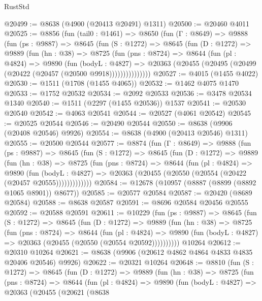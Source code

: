 \begin{lexlean}{RustStd}
\begin{coremodule}
@20499 := @8638 (@4900 (@20413 @20491) @1311)
@20500 := @20460 @4011
@20525 := @8856
    (fun (tail0 : @1461) =>
    @8650
      (fun (Γ : @8649) =>
      @9888
        (fun (ps : @9887) =>
        @8645
          (fun (S : @1272) =>
          @8645
            (fun (D : @1272) =>
            @9889
              (fun (hn : @38) =>
              @8725
                (fun (pns : @8724) =>
                @8644
                  (fun (pl : @4824) =>
                  @9890
                    (fun (bodyL : @4827) =>
                    @20363 (@20455 (@20495 (@20499 (@20422 (@20457 (@20500 @9918)))))))))))))))
@20527 := @4015 (@1455 @4022)
@20530 := @1511 (@1708 (@1455 @4065))
@20532 := @1462 @4075 @1470
@20533 := @1752 @20532
@20534 := @2092 @20533
@20536 := @3478 @20534 @1340
@20540 := @1511 (@2297 (@1455 @20536)) @1537
@20541 := @20530 @20540
@20542 := @4063 @20541
@20544 := @20527 (@4061 @20542)
@20545 := @20525 @20544
@20546 := @20490 @20544
@20550 := @8638 (@9906 (@20408 @20546) @9926)
@20554 := @8638 (@4900 (@20413 @20546) @1311)
@20555 := @20500 @20544
@20577 := @8874
    (fun (Γ : @8649) =>
    @9888
      (fun (ps : @9887) =>
      @8645
        (fun (S : @1272) =>
        @8645
          (fun (D : @1272) =>
          @9889
            (fun (hn : @38) =>
            @8725
              (fun (pns : @8724) =>
              @8644
                (fun (pl : @4824) =>
                @9890
                  (fun (bodyL : @4827) =>
                  @20363 (@20455 (@20550 (@20554 (@20422 (@20457 @20555)))))))))))))
@20584 := @12678 (@10957 (@8887 (@8899 (@8892 @1065 @8901)) @8677))
@20585 := @20577 @20584
@20587 := @20420 (@8689 @20584)
@20588 := @8638 @20587
@20591 := @8696 @20584 @20456 @20555
@20592 := @20588 @20591
@20611 := @10229
    (fun (ps : @9887) =>
    @8645
      (fun (S : @1272) =>
      @8645
        (fun (D : @1272) =>
        @9889
          (fun (hn : @38) =>
          @8725
            (fun (pns : @8724) =>
            @8644
              (fun (pl : @4824) =>
              @9890 (fun (bodyL : @4827) => @20363 (@20455 (@20550 (@20554 @20592))))))))))
    @10264
@20612 := @20310 @10264
@20621 := @8638 (@9906 (@20612 @4862 @4864 @4833 @4835 @20406 @20546) @9926)
@20622 := @20321 @10264
@20648 := @8810
    (fun (S : @1272) =>
    @8645
      (fun (D : @1272) =>
      @9889
        (fun (hn : @38) =>
        @8725
          (fun (pns : @8724) =>
          @8644
            (fun (pl : @4824) =>
            @9890
              (fun (bodyL : @4827) =>
              @20363
                (@20455
                  (@20621
                    (@8638

\end{coremodule}
\end{lexlean}
